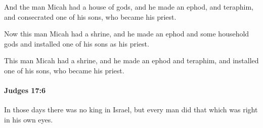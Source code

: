 			\begin{versebox}
					\item[BHS] 
					\item[ASV] And the man Micah had a house of gods, and he made an ephod, and teraphim, and consecrated one of his sons, who became his priest.
					\item[NIV] Now this man Micah had a shrine, and he made an ephod and some household gods and installed one of his sons as his priest.
					\item[NRSV] This man Micah had a shrine, and he made an ephod and teraphim, and installed one of his sons, who became his priest.
			\end{versebox}

		\paragraph{Judges 17:6} %
			\label{JUDGES-17-6}

			In those days there was no king in Israel, but every man did that which was right in his own eyes.

